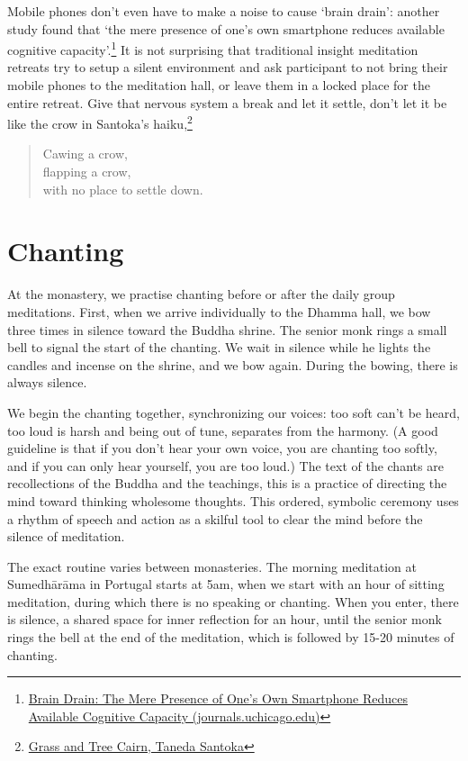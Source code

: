 Mobile phones don't even have to make a noise to cause `brain drain':
another study found that `the mere presence of one's own smartphone
reduces available cognitive capacity'.\footnote{\href{https://www.journals.uchicago.edu/doi/10.1086/691462}{Brain
  Drain: The Mere Presence of One's Own Smartphone Reduces Available
  Cognitive Capacity (journals.uchicago.edu)}} It is not surprising that
traditional insight meditation retreats try to setup a silent
environment and ask participant to not bring their mobile phones to the
meditation hall, or leave them in a locked place for the entire retreat.
Give that nervous system a break and let it settle, don't let it be like
the crow in Santoka's haiku,\footnote{\href{https://www.goodreads.com/book/show/931086.Grass_and_Tree_Cairn}{Grass
  and Tree Cairn, Taneda Santoka}}

\begin{quote}
Cawing a crow,\\
flapping a crow,\\
with no place to settle down.
\end{quote}

\clearpage

\section{Chanting}


At the monastery, we practise chanting before or after the daily group
meditations. First, when we arrive individually to the Dhamma hall, we
bow three times in silence toward the Buddha shrine. The senior monk
rings a small bell to signal the start of the chanting. We wait in
silence while he lights the candles and incense on the shrine, and we
bow again. During the bowing, there is always silence.

We begin the chanting together, synchronizing our voices: too soft can't
be heard, too loud is harsh and being out of tune, separates from the
harmony. (A good guideline is that if you don't hear your own voice, you
are chanting too softly, and if you can only hear yourself, you are too
loud.) The text of the chants are recollections of the Buddha and the
teachings, this is a practice of directing the mind toward thinking
wholesome thoughts. This ordered, symbolic ceremony uses a rhythm of
speech and action as a skilful tool to clear the mind before the silence
of meditation.

The exact routine varies between monasteries. The morning meditation at
Sumedhārāma in Portugal starts at 5am, when we start with an hour of
sitting meditation, during which there is no speaking or chanting. When
you enter, there is silence, a shared space for inner reflection for an
hour, until the senior monk rings the bell at the end of the meditation,
which is followed by 15-20 minutes of chanting.


